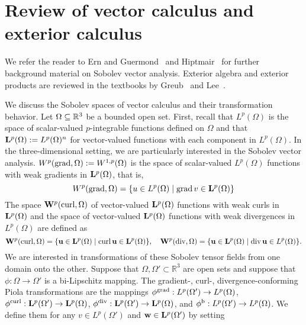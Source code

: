 \documentclass[12pt,a4paper]{article}
\begin{document}
 








\section{Review of vector calculus and exterior calculus}\label{section:calculus}

We refer the reader to Ern and Guermond~\cite{ern2021finite} and Hiptmair~\cite{hiptmair2002finite} for further background material on Sobolev vector analysis. 
Exterior algebra and exterior products are reviewed in the textbooks by Greub~\cite{greub1967multilinear} and Lee~\cite{lee2012smooth}.

We discuss the Sobolev spaces of vector calculus and their transformation behavior. 
Let $\Omega \subseteq {\mathbb R}^{3}$ be a bounded open set. 
First, recall that $L^{p}(\Omega)$ is the space of scalar-valued $p$-integrable functions defined on $\Omega$
and that ${\mathbf L}^{p}(\Omega) := L^{p}(\Omega)^{n}$ for vector-valued functions with each component in $L^{p}(\Omega)$. 
In the three-dimensional setting, we are particularly interested in the Sobolev vector analysis. 
$W^p(\operatorname{grad},\Omega) := W^{1,p}(\Omega)$ is the space of scalar-valued $L^{p}(\Omega)$ functions with weak gradients in ${\mathbf L}^{p}(\Omega)$, that is,  
\[
    W^p(\grad,\Omega) = \{ u \in L^{p}(\Omega) \suchthat \grad v \in \bfL^{p}(\Omega) \}
\]
The space ${\mathbf W}^{p}(\operatorname{curl},\Omega)$ of vector-valued ${\mathbf L}^{p}(\Omega)$ functions with weak curls in ${\mathbf L}^{p}(\Omega)$
and the space of vector-valued ${\mathbf L}^{p}(\Omega)$ functions with weak divergences in $L^{p}(\Omega)$ are defined as 
\[
    \bfW^{p}(\curl,\Omega) = \{ \bfu \in \bfL^{p}(\Omega) \suchthat \curl \bfu \in \bfL^{p}(\Omega) \},
    \quad 
    \bfW^{p}(\divergence,\Omega) = \{ \bfu \in \bfL^{p}(\Omega) \suchthat \divergence \bfu \in L^{p}(\Omega) \}.
\]
We are interested in transformations of these Sobolev tensor fields from one domain onto the other. 
Suppose that $\Omega, \Omega' \subset \mathbb{R}^3$ are open sets and suppose that $\phi: \Omega \to \Omega'$ is a bi-Lipschitz mapping.
The gradient-, curl-, divergence-conforming Piola transformations are the mappings 
$\phi^{\operatorname{grad}}: L^{p}(\Omega') \to L^{p}(\Omega)$,
$\phi^{\operatorname{curl}}: {\mathbf L}^{p}(\Omega') \to {\mathbf L}^{p}(\Omega)$, 
$\phi^{\operatorname{div}}: {\mathbf L}^{p}(\Omega') \to {\mathbf L}^{p}(\Omega)$,
and
$\phi^{\rm b}: L^{p}(\Omega') \to L^{p}(\Omega)$. 
We define them 
for any $v \in L^{p}(\Omega')$ and ${\mathbf w} \in {\mathbf L}^{p}(\Omega')$ by setting 
\end{document}
